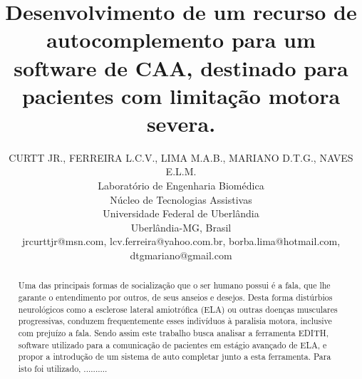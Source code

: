 \documentclass[twoside]{article}
\title{\vspace{-15mm}\fontsize{24pt}{10pt}\selectfont\textbf{Desenvolvimento de um recurso de autocomplemento para um software de CAA, destinado para pacientes com limitação motora severa.}} %
\author{
\large
\textsc{CURTT JR., FERREIRA L.C.V., LIMA M.A.B., MARIANO D.T.G., NAVES E.L.M.}\\[2mm] %
\normalsize Laboratório de Engenharia Biomédica\\\normalsize Núcleo de Tecnologias Assistivas\\\normalsize Universidade Federal de Uberlândia\\ \normalsize Uberlândia-MG, Brasil \\ %
\normalsize {jrcurttjr@msn.com, lcv.ferreira@yahoo.com.br, borba.lima@hotmail.com, dtgmariano@gmail.com} %
\vspace{-5mm}
}
\date{}
\begin{document}
\maketitle %

\thispagestyle{fancy} %



\begin{abstract}
\noindent
Uma das principais formas de socialização que o ser humano possui é a fala, que lhe garante o entendimento por outros, de seus anseios e desejos. Desta forma distúrbios neurológicos como a esclerose lateral amiotrófica (ELA) ou outras doenças musculares progressivas, conduzem frequentemente esses indivíduos à paralisia motora, inclusive com prejuízo a fala. Sendo assim este trabalho busca analisar a ferramenta EDITH, software utilizado para a comunicação de pacientes em estágio avançado de ELA, e propor a introdução de um sistema de auto completar junto a esta ferramenta. Para isto foi utilizado, .......... 
\end{abstract}

\end{document}

